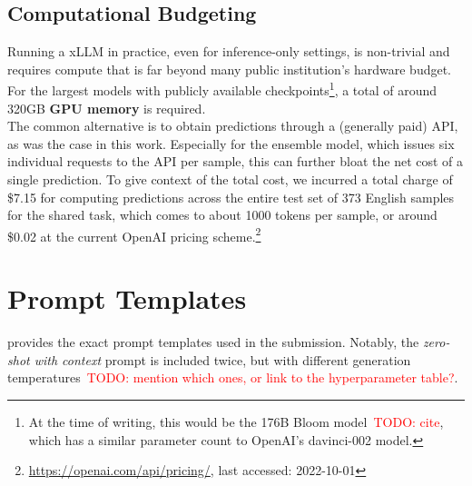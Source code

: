 \documentclass[11pt]{article}
\newcommand{\todo}[1]{\textcolor{red}{TODO: #1}}
\begin{document}
\subsection{Computational Budgeting}
Running a xLLM in practice, even for inference-only settings, is non-trivial and requires compute that is far beyond many public institution's hardware budget. For the largest models with publicly available checkpoints\footnote{At the time of writing, this would be the 176B Bloom model~\todo{cite}, which has a similar parameter count to OpenAI's davinci-002 model.}, a total of around 320GB \textbf{GPU memory} is required.\\
The common alternative is to obtain predictions through a (generally paid) API, as was the case in this work. Especially for the ensemble model, which issues six individual requests to the API per sample, this can further bloat the net cost of a single prediction.
To give context of the total cost, we incurred a total charge of \$7.15 for computing predictions across the entire test set of 373 English samples for the shared task, which comes to about 1000 tokens per sample, or around \$0.02 at the current OpenAI pricing scheme.\footnote{\url{https://openai.com/api/pricing/}, last accessed: 2022-10-01}




\appendix

\section{Prompt Templates}
\label{sec:prompts}

 provides the exact prompt templates used in the submission. Notably, the \emph{zero-shot with context} prompt is included twice, but with different generation temperatures~\todo{mention which ones, or link to the hyperparameter table?}.
\end{document}
